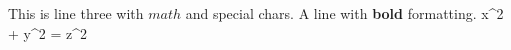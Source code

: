 \documentclass{article}
\begin{document}
This is line three with $math$ and special chars.
A line with \textbf{bold} formatting.
x^2 + y^2 = z^2
\end{document}
